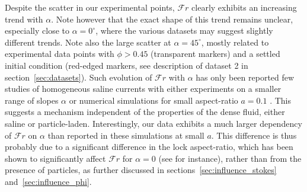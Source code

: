 \documentclass[12pt]{article}
\begin{document}
Despite the scatter in our experimental points, $\mathcal{F}r$ clearly exhibits an increasing trend with $\alpha$. Note however that the exact shape of this trend remains unclear, especially close to $\alpha=0^\circ$, where the various datasets may suggest slightly different trends. Note also the large scatter at $\alpha=45^\circ$, mostly related to experimental data points with $\phi > 0.45$ (transparent markers) and a settled initial condition (red-edged markers, see description of dataset 2 in section~\ref{sec:datasets}).
%
Such evolution of $\mathcal{F}r$ with $\alpha$ has only been reported few studies of homogeneous saline currents with either experiments on a smaller range of slopes $\alpha$ \citep{Maxworthy2007} or numerical simulations for small aspect-ratio $a = 0.1$ \citet{Birman2007}. This suggests a mechanism independent of the properties of the dense fluid, either saline or particle-laden. Interestingly, our data exhibits a much larger dependency of $\mathcal{F}r$ on $\alpha$ than reported in these simulations at small $a$. This difference is thus probably due to a significant difference in the lock aspect-ratio, which has been shown to significantly affect $\mathcal{F}r$ for $\alpha=0$ (see \citet{Bonometti2011} for instance), rather than from the presence of particles, as further discussed in sections~\ref{sec:influence_stokes} and~\ref{sec:influence_phi}.
\end{document}
